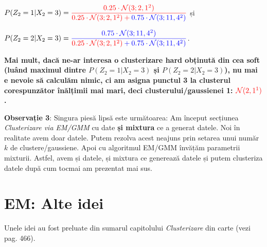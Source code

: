 \documentclass[12pt]{article}
\begin{document}
	$P(Z_2 = 1|X_2= 3) = {\color{red}\dfrac{0.25\cdot \mathcal{N}(3;2,1^2)}{0.25\cdot \mathcal{N}(3;2,1^2) + {\color{blue}0.75\cdot\mathcal{N}(3;11,4^2)}}}$ și
	
	 $P(Z_2 = 2|X_2= 3) = {\color{blue}\dfrac{0.75\cdot \mathcal{N}(3;11,4^2)}{{\color{red}0.25\cdot \mathcal{N}(3;2,1^2)} + 0.75\cdot\mathcal{N}(3;11,4^2)}}$. 
	 
	 \textbf{Mai mult, dacă ne-ar interesa o clusterizare \textbf{hard} obținută din cea soft (luând maximul dintre $P(Z_2 = 1|X_2=3)$ și $P(Z_2 = 2|X_2=3)$), nu mai e nevoie să calculăm nimic, ci am asigna punctul 3 la clusterul corespunzător înălțimii mai mari, deci clusterului/gaussienei 1: $\color{red}\mathcal{N}(2,1^1)$.}
	
		\textbf{Observație 3}: Singura piesă lipsă este următoarea: Am început secțiunea \textit{Clusterizare via EM/GMM} cu date \textbf{și mixtura} ce a generat datele. Noi în realitate avem doar datele. Putem rezolva acest neajuns prin setarea unui număr $k$ de clustere/gaussiene. Apoi cu algoritmul EM/GMM învățăm parametrii mixturii. Astfel, avem și datele, și mixtura ce generează datele și putem clusteriza datele după cum tocmai am prezentat mai sus.
	\newpage
	\section{EM: Alte idei}
	
	Unele idei au fost preluate din sumarul capitolului \textit{Clusterizare} din carte (vezi pag. 466).
	
\end{document}
